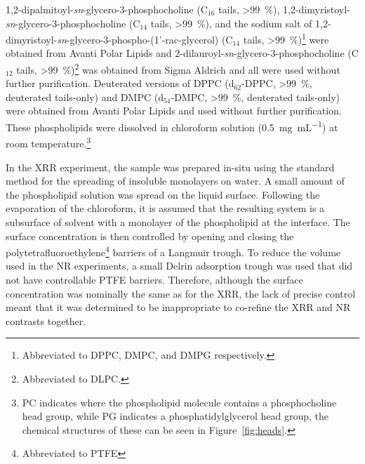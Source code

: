1,2-dipalmitoyl-\emph{sn}-glycero-3-phosphocholine (C$_{16}$ tails, \SI{>99}{\percent}), 1,2-dimyristoyl-\emph{sn}-glycero-3-phosphocholine (C$_{14}$ tails, \SI{>99}{\percent}), and the sodium salt of 1,2-dimyristoyl-\emph{sn}-glycero-3-phospho-(1'-rac-glycerol) (C$_{14}$ tails, \SI{>99}{\percent})\footnote{Abbreviated to DPPC, DMPC, and DMPG respectively.} were obtained from Avanti Polar Lipids and 2-dilauroyl-\emph{sn}-glycero-3-phosphocholine (C$_{12}$ tails, \SI{>99}{\percent})\footnote{Abbreviated to DLPC.} was obtained from Sigma Aldrich and all were used without further purification.
Deuterated versions of DPPC (d$_{62}$-DPPC, \SI{>99}{\percent}, deuterated tails-only) and DMPC (d$_{54}$-DMPC, \SI{>99}{\percent}, deuterated tails-only) were obtained from Avanti Polar Lipids and used without further purification.
These phospholipids were dissolved in chloroform solution (\SI{0.5}{\milli\gram\per\milli\liter}) at room temperature.\footnote{PC indicates where the phospholipid molecule contains a phosphocholine head group, while PG indicates a phosphatidylglycerol head group, the chemical structures of these can be seen in Figure~\ref{fig:heads}.}

In the XRR experiment, the sample was prepared in-situ using the standard method for the spreading of insoluble monolayers on water.
A small amount of the phospholipid solution was spread on the liquid surface.
Following the evaporation of the chloroform, it is assumed that the resulting system is a subsurface of solvent with a monolayer of the phospholipid at the interface.
The surface concentration is then controlled by opening and closing the polytetrafluoroethylene\footnote{Abbreviated to PTFE} barriers of a Langmuir trough.
To reduce the volume used in the NR experiments, a small Delrin adsorption trough was used that did not have controllable PTFE barriers.
Therefore, although the surface concentration was nominally the same as for the XRR, the lack of precise control meant that it was determined to be inappropriate to co-refine the XRR and NR contrasts together.

